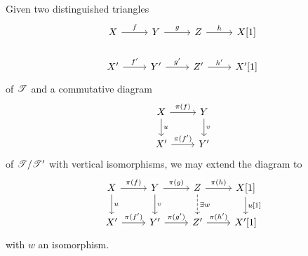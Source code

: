 \documentclass[dissertation.tex]{subfiles}
\begin{document}
\begin{lem}\label{ExtendTriangleIsomorphism}
  Given two distinguished triangles
  $$\begin{tikzcd}
    X \arrow{r}{f} & Y \arrow{r}{g} & Z \arrow{r}{h} & X[1]\\
    X^\prime \arrow{r}{f^\prime} & Y^\prime \arrow{r}{g^\prime} & Z^\prime \arrow{r}{h^\prime} & X^\prime[1]
  \end{tikzcd}$$
  of $\mathscr{T}$ and a commutative diagram
  $$\begin{tikzcd}
    X \arrow{r}{\pi(f)}\arrow{d}{u} & Y\arrow{d}{v}\\
    X^\prime \arrow{r}{\pi(f^\prime)} & Y^\prime
  \end{tikzcd}$$
  of $\mathscr{T}/\mathscr{T}^\prime$ with vertical isomorphisms, we may extend the diagram to 
  $$\begin{tikzcd}
    X \arrow{r}{\pi(f)}\arrow{d}{u} & Y\arrow{d}{v} \arrow{r}{\pi(g)} & Z \arrow{r}{\pi(h)}\arrow[dashed]{d}{\exists w} & X[1] \arrow{d}{u[1]}\\
    X^\prime \arrow{r}{\pi(f^\prime)} & Y^\prime \arrow{r}{\pi(g^\prime)} & Z^\prime \arrow{r}{\pi(h^{\prime})} & X^\prime[1]
  \end{tikzcd}$$
  with $w$ an isomorphism.
  

\end{lem}
\end{document}
